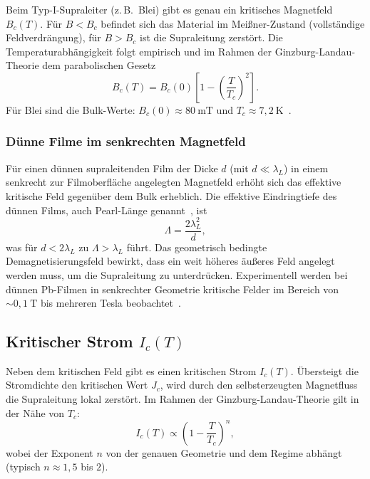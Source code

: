Beim Typ-I-Supraleiter (z.\,B.\ Blei) gibt es genau ein kritisches Magnetfeld $B_c(T)$.
Für $B < B_c$ befindet sich das Material im Meißner-Zustand (vollständige Feldverdrängung), für $B > B_c$ ist die Supraleitung zerstört.
Die Temperaturabhängigkeit folgt empirisch und im Rahmen der Ginzburg-Landau-Theorie dem parabolischen Gesetz
\begin{equation}
    B_c(T) = B_c(0)\left[1 - \left(\frac{T}{T_c}\right)^2\right].
    \label{eq:bc_parabola}
\end{equation}
Für Blei sind die Bulk-Werte: $B_c(0) \approx 80~\mathrm{mT}$ und $T_c \approx 7{,}2~\mathrm{K}$~\cite{Buckel2013}.

\subsubsection*{Dünne Filme im senkrechten Magnetfeld}

Für einen dünnen supraleitenden Film der Dicke $d$ (mit $d \ll \lambda_L$) in einem senkrecht zur Filmoberfläche angelegten Magnetfeld erhöht sich das effektive kritische Feld gegenüber dem Bulk erheblich.
Die effektive Eindringtiefe des dünnen Films, auch Pearl-Länge genannt~\cite{Pearl1964}, ist
\begin{equation}
    \Lambda = \frac{2\lambda_L^2}{d},
\end{equation}
was für $d < 2\lambda_L$ zu $\Lambda > \lambda_L$ führt.
Das geometrisch bedingte Demagnetisierungsfeld bewirkt, dass ein weit höheres äußeres Feld angelegt werden muss, um die Supraleitung zu unterdrücken.
Experimentell werden bei dünnen Pb-Filmen in senkrechter Geometrie kritische Felder im Bereich von $\sim 0{,}1~\mathrm{T}$ bis mehreren Tesla beobachtet~\cite{Tinkham2004}.

\subsection{Kritischer Strom $I_c(T)$}

Neben dem kritischen Feld gibt es einen kritischen Strom $I_c(T)$.
Übersteigt die Stromdichte den kritischen Wert $J_c$, wird durch den selbsterzeugten Magnetfluss die Supraleitung lokal zerstört.
Im Rahmen der Ginzburg-Landau-Theorie gilt in der Nähe von $T_c$:
\begin{equation}
    I_c(T) \propto \left(1 - \frac{T}{T_c}\right)^n,
    \label{eq:ic_gl}
\end{equation}
wobei der Exponent $n$ von der genauen Geometrie und dem Regime abhängt (typisch $n \approx 1{,}5$ bis $2$).

